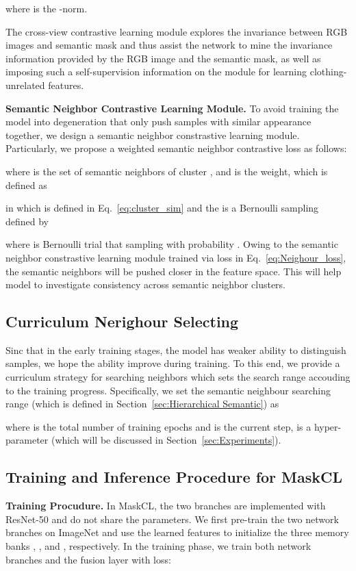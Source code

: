 \documentclass[10pt,twocolumn,letterpaper]{article}
\newcommand{\myparagraph}[1]{\noindent\textbf{#1.}}
\begin{document}
where  is the -norm.

The cross-view contrastive learning module 
explores the invariance between RGB images and semantic mask and thus assist the network to mine the invariance information provided by the RGB image and the semantic mask, as well as imposing such a self-supervision information on the module for learning clothing-unrelated features.


\myparagraph{Semantic Neighbor Contrastive Learning Module}
To avoid training the model into degeneration that only push samples with similar appearance together, we design a semantic neighbor constrastive learning module.
Particularly, we propose a weighted semantic neighbor contrastive loss as follows: 

where  is the set of semantic neighbors of cluster , and  is the weight, which is defined as

in which  is defined in Eq.~\eqref{eq:cluster_sim} and the  is 
a Bernoulli sampling defined by

where  is Bernoulli trial that sampling  with probability .
Owing to the semantic neighbor constrastive learning module trained via loss in Eq.~\eqref{eq:Neighour_loss}, the semantic neighbors will be pushed closer in the feature space. This will help model to investigate consistency across semantic neighbor clusters.




\subsection{Curriculum Nerighour Selecting }
\label{sec:Curriculumneighbor}
Sinc that in the early training stages, the model has weaker ability to distinguish samples, we hope the ability improve during training. 
To this end, we provide a curriculum strategy for searching neighbors which sets the search range accouding to the training progress. Specifically, we set the semantic neighbour searching range  (which is defined in Section~\ref{sec:Hierarchical Semantic}) as

where  is the total number of training epochs and  is the current step,  is a hyper-parameter (which will be discussed in Section~\ref{sec:Experiments}).


\subsection{Training and Inference Procedure for MaskCL}

\myparagraph{Training Procudure}
In MaskCL, the two branches are implemented with ResNet-50 \cite{he:CVPR16resnet} and do not share the parameters. We first pre-train the two network branches on ImageNet and use the learned features to initialize the three memory banks , , and , respectively. 
In the training phase, we train both network branches and the fusion layer with loss:
\end{document}
